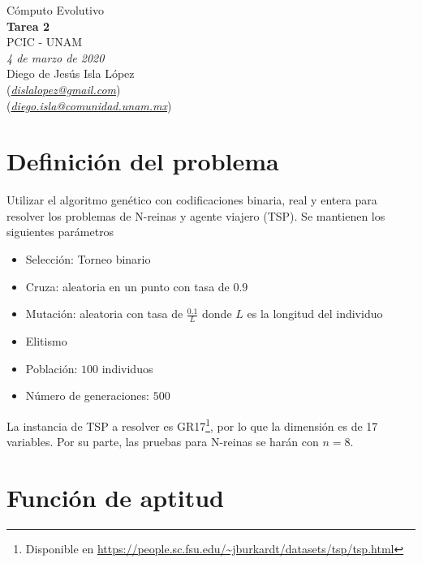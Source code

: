 \documentclass[letterpaper,12pt]{article}
\theoremstyle{definition}
\begin{document}
\begin{center}
  {\large Cómputo Evolutivo}\\
  \vspace{0.2cm}
  {\large\bfseries Tarea 2}\\
  \vspace{0.2cm}
  {\large PCIC - UNAM}\\
  \vspace{0.5cm}
  {\itshape 4 de marzo de 2020}\\
  \vspace{0.5cm}
  Diego de Jesús Isla López\\
  (\href{mailto:dislalopez@gmail.com}{\itshape dislalopez@gmail.com})\\
  (\href{mailto:diego.isla@comunidad.unam.mx}{\itshape diego.isla@comunidad.unam.mx})\\
\end{center}



\section{Definición del problema}

Utilizar el algoritmo genético con codificaciones binaria, real y entera para resolver los problemas de N-reinas y agente viajero (TSP). Se mantienen los siguientes parámetros\\

\begin{itemize}
  \item Selección: Torneo binario
  \item Cruza: aleatoria en un punto con tasa de \(0.9\)
  \item Mutación: aleatoria con tasa de \(\frac{0.1}{L}\) donde \(L\) es la longitud del individuo
  \item Elitismo
  \item Población: \(100\) individuos
  \item Número de generaciones: \(500\)
\end{itemize}

\medskip

La instancia de TSP a resolver es GR17\footnote{Disponible en \url{https://people.sc.fsu.edu/~jburkardt/datasets/tsp/tsp.html}}, por lo que la dimensión es de 17 variables. Por su parte, las pruebas para N-reinas se harán con \(n = 8\).


\section{Función de aptitud}
\end{document}
